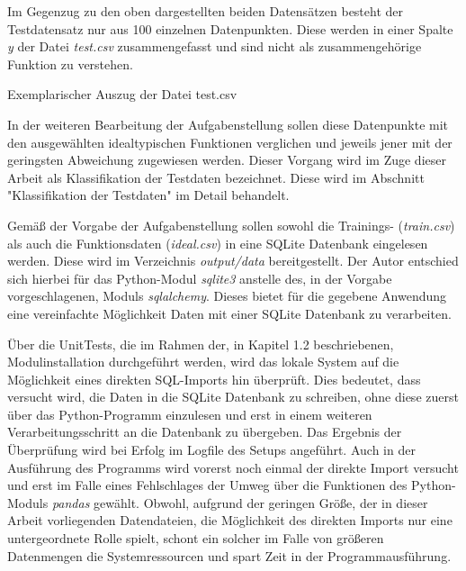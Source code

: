 
Im Gegenzug zu den oben dargestellten beiden Datensätzen besteht der Testdatensatz nur aus 100 einzelnen Datenpunkten. Diese werden in einer Spalte \emph{y} der Datei \emph{test.csv} zusammengefasst und sind nicht als zusammengehörige Funktion zu verstehen. 

\begin{table}[H]
\small
\centering
{}
\caption{Exemplarischer Auszug der Datei test.csv}
\label{tab:test.csv}
\end{table} 

In der weiteren Bearbeitung der Aufgabenstellung sollen diese Datenpunkte mit den ausgewählten idealtypischen Funktionen verglichen und jeweils jener mit der geringsten Abweichung zugewiesen werden. Dieser Vorgang wird im Zuge dieser Arbeit als Klassifikation der Testdaten bezeichnet. Diese wird im Abschnitt "Klassifikation der Testdaten" im Detail behandelt.

Gemäß der Vorgabe der Aufgabenstellung sollen sowohl die Trainings- (\emph{train.csv}) als auch die Funktionsdaten (\emph{ideal.csv}) in eine SQLite Datenbank eingelesen werden. Diese wird im Verzeichnis \emph{output/data} bereitgestellt. Der Autor entschied sich hierbei für das Python-Modul \emph{sqlite3} anstelle des, in der Vorgabe vorgeschlagenen, Moduls \emph{sqlalchemy}. Dieses bietet für die gegebene Anwendung eine vereinfachte Möglichkeit Daten mit einer SQLite Datenbank zu verarbeiten.

Über die UnitTests, die im Rahmen der, in Kapitel 1.2 beschriebenen, Modulinstallation durchgeführt werden, wird das lokale System auf die Möglichkeit eines direkten SQL-Imports hin überprüft. Dies bedeutet, dass versucht wird, die Daten in die SQLite Datenbank zu schreiben, ohne diese zuerst über das Python-Programm einzulesen und erst in einem weiteren Verarbeitungsschritt an die Datenbank zu übergeben. Das Ergebnis der Überprüfung wird bei Erfolg im Logfile des Setups angeführt. Auch in der Ausführung des Programms wird vorerst noch einmal der direkte Import versucht und erst im Falle eines Fehlschlages der Umweg über die Funktionen des Python-Moduls \emph{pandas} gewählt. Obwohl, aufgrund der geringen Größe, der in dieser Arbeit vorliegenden Datendateien, die Möglichkeit des direkten Imports nur eine untergeordnete Rolle spielt, schont ein solcher im Falle von größeren Datenmengen die Systemressourcen und spart Zeit in der Programmausführung.

